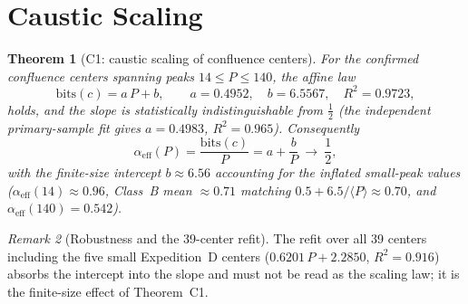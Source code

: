 \documentclass[12pt,a4paper]{article}
\newtheorem{theorem}{Theorem}[section]
\theoremstyle{remark}
\newtheorem{remark}[theorem]{Remark}
\begin{document}
\section{Caustic Scaling}
\begin{theorem}[C1: caustic scaling of confluence centers]
For the confirmed confluence centers spanning peaks $14 \le P \le 140$,
the affine law
\[
\mathrm{bits}(c) = a\,P + b,\qquad a = 0.4952,\quad b = 6.5567,\quad R^2 = 0.9723,
\]
holds, and the slope is statistically indistinguishable from $\tfrac12$
(the independent primary-sample fit gives $a=0.4983$, $R^2=0.965$).
Consequently
\[
\alpha_{\mathrm{eff}}(P)=\frac{\mathrm{bits}(c)}{P}=a+\frac{b}{P}\ \longrightarrow\ \frac12,
\]
with the finite-size intercept $b\approx6.56$ accounting for the inflated
small-peak values ($\alpha_{\mathrm{eff}}(14)\approx0.96$, Class~B mean
$\approx0.71$ matching $0.5+6.5/\langle P\rangle\approx0.70$, and
$\alpha_{\mathrm{eff}}(140)=0.542$).
\end{theorem}
\begin{remark}[Robustness and the 39-center refit]
The refit over all 39 centers including the five small Expedition~D centers
($0.6201\,P+2.2850$, $R^2=0.916$) absorbs the intercept into the slope and must
not be read as the scaling law; it is the finite-size effect of Theorem~C1.
\end{remark}
\end{document}
